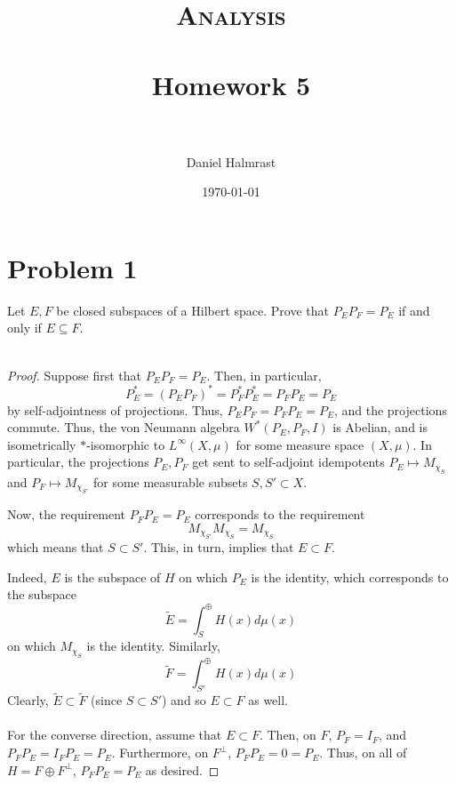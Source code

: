 \documentclass[fontsize=11pt]{scrartcl} %
\title{	
\normalfont \normalsize 
\textsc{Analysis} \\ [25pt] %
\horrule{0.5pt} \\[0.4cm] %
\huge Homework 5 \\ %
\horrule{2pt} \\[0.5cm] %
}
\author{Daniel Halmrast} %
\date{\normalsize\today} %
\numberwithin{equation}{section} %
\numberwithin{figure}{section} %
\numberwithin{table}{section} %
\begin{document}
\maketitle %

\section*{Problem 1}
Let $E,F$ be closed subspaces of a Hilbert space. Prove that $P_EP_F=P_E$ if and
only if $E\subseteq F$.
\\
\\
\begin{proof}
    Suppose first that $P_EP_F=P_E$. Then, in particular,
    \[
        P_E^* = (P_EP_F)^* = P_F^*P_E^* = P_FP_E = P_E
    \]
    by self-adjointness of projections. Thus, $P_EP_F=P_FP_E=P_E$, and the
    projections commute. Thus, the von Neumann algebra $W^*(P_E,P_F,I)$ is
    Abelian, and is isometrically $*$-isomorphic to $L^{\infty}(X,\mu)$ for some
    measure space $(X,\mu)$. In particular, the projections $P_E,P_F$ get sent
    to self-adjoint idempotents $P_E\mapsto M_{\chi_S}$ and $P_F\mapsto
    M_{\chi_{S'}}$ for some measurable subsets $S,S'\subset X$.

    Now, the requirement $P_FP_E=P_E$ corresponds to the requirement
    \[
        M_{\chi_{S'}}M_{\chi_S}=M_{\chi_S}
    \]
    which means that $S\subset S'$. This, in turn, implies that $E\subset F$.

    Indeed, $E$ is the subspace of $H$ on which $P_E$ is the identity, which
    corresponds to the subspace
    \[
        \tilde{E} = \int_S^{\oplus}H(x)d\mu(x)
    \]
    on which $M_{\chi_S}$ is the identity. Similarly,
    \[
        \tilde{F} = \int_{S'}^{\oplus}H(x)d\mu(x)
    \]
    Clearly, $\tilde{E}\subset \tilde{F}$ (since $S\subset S'$) and so $E\subset
    F$ as well.
    \\
    \\
    For the converse direction, assume that $E\subset F$. Then, on $F$, $P_F =
    I_F$, and $P_FP_E = I_FP_E = P_E$. Furthermore, on $F^{\perp}$, $P_FP_E = 0
    = P_E$. Thus, on all of $H=F\oplus F^{\perp}$, $P_FP_E=P_E$ as desired.
\end{proof}

\newpage
\end{document}
